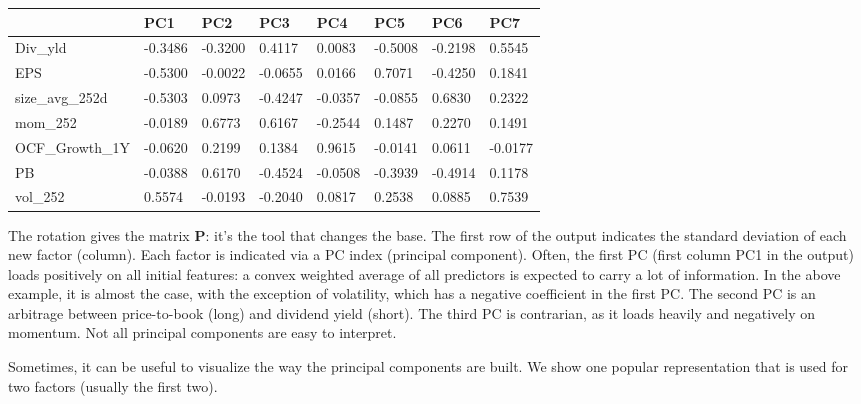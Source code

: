 \bigskip\noindent
\begin{tabular}{p{}p{}p{}p{}p{}p{}p{}p{}}
\toprule
 & PC1 & PC2 & PC3 & PC4 & PC5 & PC6 & PC7 \\
\hline
Div\_yld & -0.3486 & -0.3200 & 0.4117 & 0.0083 & -0.5008 & -0.2198 & 0.5545 \\
\hline
EPS & -0.5300 & -0.0022 & -0.0655 & 0.0166 & 0.7071 & -0.4250 & 0.1841 \\
\hline
size\_avg\_252d & -0.5303 & 0.0973 & -0.4247 & -0.0357 & -0.0855 & 0.6830 & 0.2322 \\
\hline
mom\_252 & -0.0189 & 0.6773 & 0.6167 & -0.2544 & 0.1487 & 0.2270 & 0.1491 \\
\hline
OCF\_Growth\_1Y & -0.0620 & 0.2199 & 0.1384 & 0.9615 & -0.0141 & 0.0611 & -0.0177 \\
\hline
PB & -0.0388 & 0.6170 & -0.4524 & -0.0508 & -0.3939 & -0.4914 & 0.1178 \\
\hline
vol\_252 & 0.5574 & -0.0193 & -0.2040 & 0.0817 & 0.2538 & 0.0885 & 0.7539 \\
\hline
\bottomrule
\end{tabular}

\bigskip

The rotation gives the matrix $\textbf{P}$: it's the tool that changes the base. The first row of the output indicates the standard deviation of each new factor (column). Each factor is indicated via a PC index (principal component). Often, the first PC (first column PC1 in the output) loads positively on all initial features: a convex weighted average of all predictors is expected to carry a lot of information. In the above example, it is almost the case, with the exception of volatility, which has a negative coefficient in the first PC. The second PC is an arbitrage between price-to-book (long) and dividend yield (short). The third PC is contrarian, as it loads heavily and negatively on momentum. Not all principal components are easy to interpret.

Sometimes, it can be useful to visualize the way the principal components are built. We show one popular representation that is used for two factors (usually the first two).

